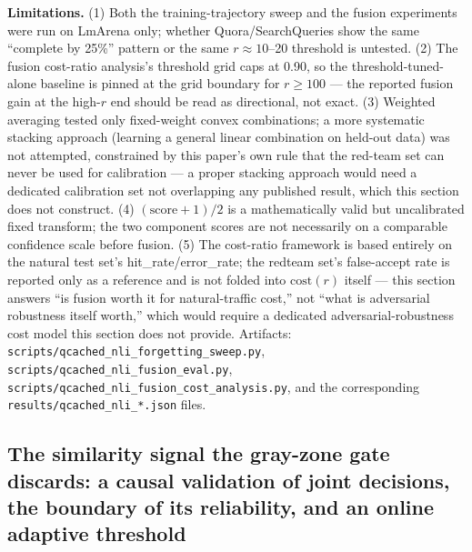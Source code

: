 \documentclass[11pt]{article}
\begin{document}
\textbf{Limitations.} (1) Both the training-trajectory sweep and the fusion experiments were run on LmArena only; whether Quora/SearchQueries show the same ``complete by 25\%'' pattern or the same $r \approx 10$--20 threshold is untested. (2) The fusion cost-ratio analysis's threshold grid caps at 0.90, so the threshold-tuned-alone baseline is pinned at the grid boundary for $r \ge 100$ --- the reported fusion gain at the high-$r$ end should be read as directional, not exact. (3) Weighted averaging tested only fixed-weight convex combinations; a more systematic stacking approach (learning a general linear combination on held-out data) was not attempted, constrained by this paper's own rule that the red-team set can never be used for calibration --- a proper stacking approach would need a dedicated calibration set not overlapping any published result, which this section does not construct. (4) $(\text{score} + 1) / 2$ is a mathematically valid but uncalibrated fixed transform; the two component scores are not necessarily on a comparable confidence scale before fusion. (5) The cost-ratio framework is based entirely on the natural test set's hit\_rate/error\_rate; the redteam set's false-accept rate is reported only as a reference and is not folded into $\mathrm{cost}(r)$ itself --- this section answers ``is fusion worth it for natural-traffic cost,'' not ``what is adversarial robustness itself worth,'' which would require a dedicated adversarial-robustness cost model this section does not provide. Artifacts: \texttt{scripts/\allowbreak{}qcached\_\allowbreak{}nli\_\allowbreak{}forgetting\_\allowbreak{}sweep.\allowbreak{}py}, \texttt{scripts/\allowbreak{}qcached\_\allowbreak{}nli\_\allowbreak{}fusion\_\allowbreak{}eval.\allowbreak{}py}, \texttt{scripts/\allowbreak{}qcached\_\allowbreak{}nli\_\allowbreak{}fusion\_\allowbreak{}cost\_\allowbreak{}analysis.\allowbreak{}py}, and the corresponding \texttt{results/\allowbreak{}qcached\_\allowbreak{}nli\_\allowbreak{}*.\allowbreak{}json} files.

\subsection{The similarity signal the gray-zone gate discards: a causal validation of joint decisions, the boundary of its reliability, and an online adaptive threshold}
\label{sec:jointgrayzone}
\end{document}
